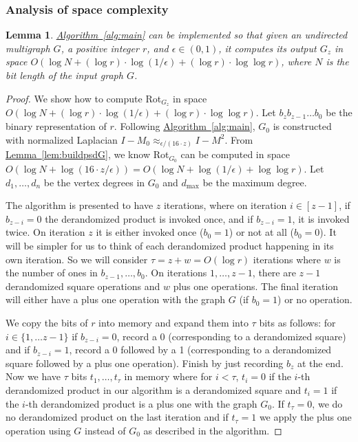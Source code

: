 \documentclass[11pt]{article}
\numberwithin{equation}{section}
\newtheorem{lemma}[theorem]{Lemma}
\theoremstyle{definition}
\theoremstyle{plain}
\newcommand{\expref}[2]{\hyperref[#2]{#1~\ref{#2}}}
\newcommand{\SC}{O(\log N + (\log r)\cdot\log(1/\epsilon)+(\log r)\cdot \log\log r)}
\newcommand{\dmax}{d_{\mathrm{max}}}
\numberwithin{myalgctr}{section}
\theoremstyle{named}
\begin{document}
\subsubsection{Analysis of space complexity}
\begin{lemma}
\label{lem:pf_of_space}
\expref{Algorithm}{alg:main} can be implemented so that given an undirected multigraph $G$, a positive integer $r$, and $\epsilon\in(0,1)$, it computes its output $G_z$ in space $\SC$, where $N$ is the bit length of the input graph $G$. 
\end{lemma}
\begin{proof}
We show how to compute Rot$_{G_z}$ in space $\SC$. Let $b_zb_{z-1}\ldots b_0$ be the binary representation of $r$. Following \expref{Algorithm}{alg:main}, $G_0$ is constructed with normalized Laplacian $I-M_0\approx_{\epsilon/(16\cdot z)}I-M^2$. {}From \expref{Lemma}{lem:buildpsdG}, we know Rot$_{G_0}$ can be computed in space $O(\log N + \log(16\cdot z/\epsilon))=O(\log N+\log(1/\epsilon)+\log\log r)$. Let $d_1,\ldots,d_n$ be the vertex degrees in $G_0$ and $\dmax$ be the maximum degree. 

The algorithm is presented to have $z$ iterations, where on iteration $i\in[z-1]$, if $b_{z-i}=0$ the derandomized product is invoked once, and if $b_{z-i}=1$, it is invoked twice. On iteration $z$ it is either invoked once ($b_0=1$)  or not at all ($b_0=0$). It will be simpler for us to think of each derandomized product happening in its own iteration. So we will consider $\tau=z+w=O(\log r)$ iterations where $w$ is the number of ones in $b_{z-1},\ldots,b_{0}$. On iterations $1,\ldots,z-1$, there are $z-1$ derandomized square operations and $w$ plus one operations. The final iteration will either have a plus one operation with the graph $G$ (if $b_0=1$) or no operation.

We copy the bits of $r$ into memory and expand them into $\tau$ bits as follows: for $i\in\{1,\ldots z-1\}$ if $b_{z-i}=0$, record a 0 (corresponding to a derandomized square) and if $b_{z-i}=1$, record a 0 followed by a 1 (corresponding to a derandomized square followed by a plus one operation). Finish by just recording $b_z$ at the end. Now we have $\tau$ bits $t_1,\ldots, t_\tau$ in memory where for $i<\tau$, $t_i=0$ if the $i$-th derandomized product in our algorithm is a derandomized square and $t_i=1$ if the $i$-th derandomized product is a plus one with the graph $G_0$. If $t_\tau=0$, we do no derandomized product on the last iteration and if $t_\tau=1$ we apply the plus one operation using $G$ instead of $G_0$ as described in the algorithm. 


\end{proof}
\end{document}
